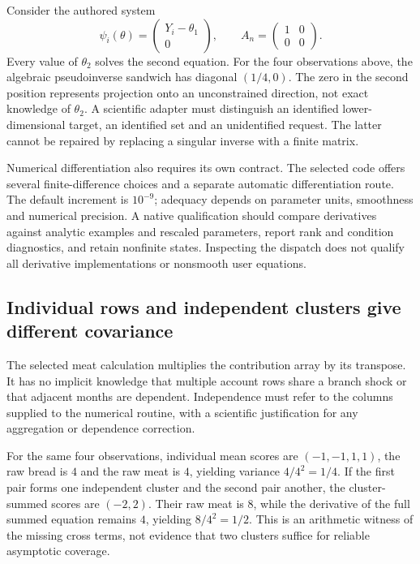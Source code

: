 Consider the authored system
\[
 \psi_i(\theta)=\begin{pmatrix}Y_i-\theta_1\\0\end{pmatrix},\qquad
 A_n=\begin{pmatrix}1&0\\0&0\end{pmatrix}.
\]
Every value of $\theta_2$ solves the second equation. For the four
observations above, the algebraic pseudoinverse sandwich has diagonal
$(1/4,0)$. The zero in the second position represents projection onto an
unconstrained direction, not exact knowledge of $\theta_2$. A scientific
adapter must distinguish an identified lower-dimensional target, an
identified set and an unidentified request. The latter cannot be repaired
by replacing a singular inverse with a finite matrix.
\citep{exec24_delicatessen_choice}

Numerical differentiation also requires its own contract. The selected
code offers several finite-difference choices and a separate automatic
differentiation route. The default increment is $10^{-9}$; adequacy
depends on parameter units, smoothness and numerical precision. A native
qualification should compare derivatives against analytic examples and
rescaled parameters, report rank and condition diagnostics, and retain
nonfinite states. Inspecting the dispatch does not qualify all derivative
implementations or nonsmooth user equations.~\citep{exec24_delicatessen_source,exec24_delicatessen_choice}

\subsection{Individual rows and independent clusters give different covariance}
The selected meat calculation multiplies the contribution array by its
transpose. It has no implicit knowledge that multiple account rows share
a branch shock or that adjacent months are dependent. Independence must
refer to the columns supplied to the numerical routine, with a scientific
justification for any aggregation or dependence correction.
\citep{exec24_delicatessen_source}

For the same four observations, individual mean scores are
$(-1,-1,1,1)$, the raw bread is $4$ and the raw meat is $4$, yielding
variance $4/4^2=1/4$. If the first pair forms one independent cluster
and the second pair another, the cluster-summed scores are $(-2,2)$.
Their raw meat is $8$, while the derivative of the full summed equation
remains $4$, yielding $8/4^2=1/2$. This is an arithmetic witness of the
missing cross terms, not evidence that two clusters suffice for reliable
asymptotic coverage.~\citep{exec24_delicatessen_choice}

